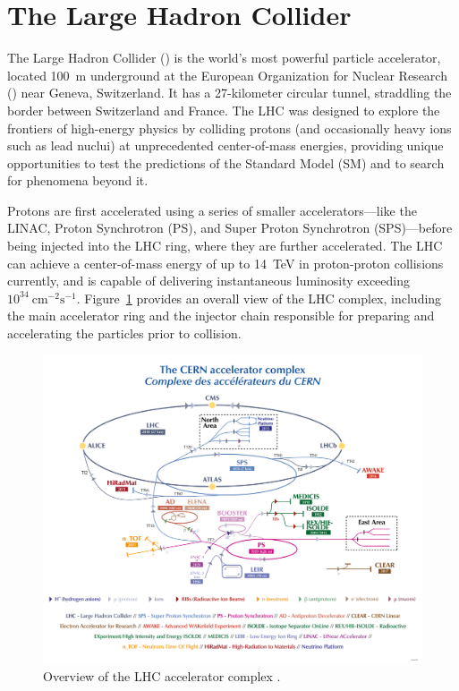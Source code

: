 \section{The Large Hadron Collider} \label{sec:LHC}
The Large Hadron Collider (\LHC) is the world’s most powerful particle accelerator, located 100~m underground at the European Organization for Nuclear Research (\CERN) near Geneva, Switzerland. It has a 27-kilometer circular tunnel, straddling the border between Switzerland and France. The LHC was designed to explore the frontiers of high-energy physics by colliding protons (and occasionally heavy ions such as lead nuclui) at unprecedented center-of-mass energies, providing unique opportunities to test the predictions of the Standard Model (SM) and to search for phenomena beyond it.

Protons are first accelerated using a series of smaller accelerators—like the LINAC, Proton Synchrotron (PS), and Super Proton Synchrotron (SPS)—before being injected into the LHC ring, where they are further accelerated. The LHC can achieve a center-of-mass energy of up to 14~TeV in proton-proton collisions currently, and is capable of delivering instantaneous luminosity exceeding $10^{34}~\mathrm{cm}^{-2}\mathrm{s}^{-1}$. Figure~\ref{fig:LHC_complex} provides an overall view of the LHC complex, including the main accelerator ring and the injector chain responsible for preparing and accelerating the particles prior to collision.

\begin{figure}[htbp]
  \centering
  \includegraphics[width=1.0\textwidth]{figs/chapter1/LHC_complex.png}
  \caption{Overview of the LHC accelerator complex \cite{LHCComplex}.}
  \label{fig:LHC_complex}
\end{figure}

